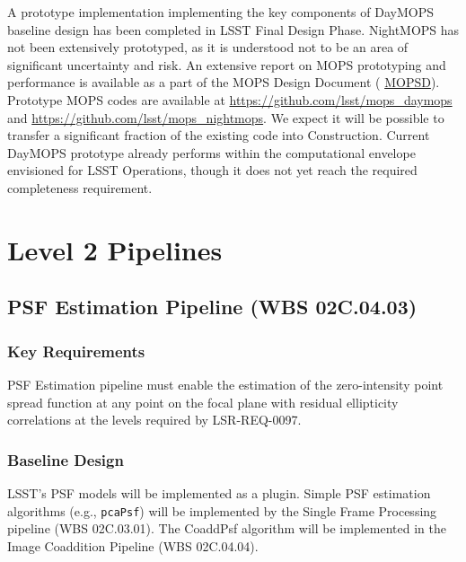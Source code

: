 \documentclass[12pt]{article}
\newcommand{\ds}[2]{{\color{blue} \href{https://docushare.lsstcorp.org/docushare/dsweb/Get/#1}{#2}}\xspace}
\newcommand{\MOPSD}{\ds{LDM-156}{MOPSD}}
\newcommand{\wbsSFM}{WBS 02C.03.01}
\newcommand{\wbsPSF}{WBS 02C.04.03}
\newcommand{\wbsCoadd}{WBS 02C.04.04}
\begin{document}
A prototype implementation implementing the key components of DayMOPS baseline design has been completed in LSST Final Design Phase. NightMOPS has not been extensively prototyped, as it is understood not to be an area of significant uncertainty and risk. An extensive report on MOPS prototyping and performance is available as a part of the MOPS Design Document (\MOPSD).
\\

Prototype MOPS codes are available at \url{https://github.com/lsst/mops_daymops} and \url{https://github.com/lsst/mops_nightmops}. We expect it will be possible to transfer a significant fraction of the existing code into Construction. Current DayMOPS prototype already performs within the computational envelope envisioned for LSST Operations, though it does not yet reach the required completeness requirement.

\clearpage

\section{Level 2 Pipelines}

\subsection{PSF Estimation Pipeline (\wbsPSF)}

\subsubsection{Key Requirements}

PSF Estimation pipeline must enable the estimation of the zero-intensity point spread function at any point on the focal plane with residual ellipticity correlations at the levels required by LSR-REQ-0097.

\subsubsection{Baseline Design}

LSST's PSF models will be implemented as a plugin. Simple PSF estimation algorithms (e.g., {\tt pcaPsf}) will be implemented by the Single Frame Processing pipeline (\wbsSFM). The CoaddPsf algorithm will be implemented in the Image Coaddition Pipeline (\wbsCoadd).
\end{document}
